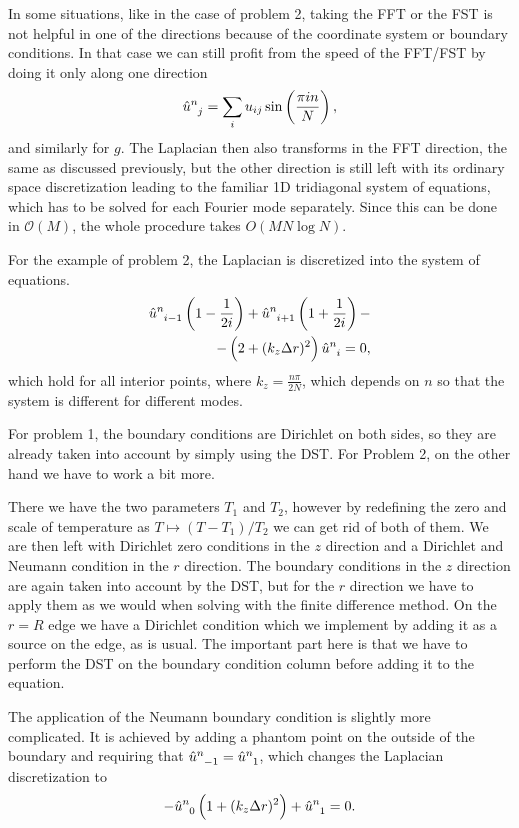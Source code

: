\documentclass[10pt,a4paper,twocolumn]{article}
\begin{document}
In some situations, like in the case of problem 2, taking the FFT or the FST is not helpful in one of the directions because of the coordinate system or boundary conditions. In that case we can still profit from the speed of the FFT/FST by doing it only along one direction
%
\begin{align}
    \tensor{\hat{u}}{^n_j} = \sum_{i} u_{ij} \sin \left( \frac{\pi i n}{N} \right),
\end{align}
%
and similarly for $g$. The Laplacian then also transforms in the FFT direction, the same as discussed previously, but the other direction is still left with its ordinary space discretization leading to the familiar 1D tridiagonal system of equations, which has to be solved for each Fourier mode separately. Since this can be done in $\mathcal{O}(M)$, the whole procedure takes $O(M N \log N)$.


For the example of problem 2, the Laplacian is discretized into the system of equations.
%
\begin{align}
    \tensor{\hat{u}}{^n_{i-1}} \left(1-\frac{1}{2 i}\right) + \tensor{\hat{u}}{^n_{i+1}} \left(1+\frac{1}{2 i}\right) -\notag\\- \left( 2 +  (k_z \Delta r)^2 \right) \tensor{\hat{u}}{^n_{i}} = 0,
\end{align}
%
which hold for all interior points, where $k_z = \frac{n \pi}{2 N}$, which depends on $n$ so that the system is different for different modes.

For problem 1, the boundary conditions are Dirichlet on both sides, so they are already taken into account by simply using the DST. For Problem 2, on the other hand we have to work a bit more.

There we have the two parameters $T_1$ and $T_2$, however by redefining the zero and scale of temperature as $T \mapsto (T - T_1) / T_2$ we can get rid of both of them. We are then left with Dirichlet zero conditions in the $z$ direction and a Dirichlet and Neumann condition in the $r$ direction. The boundary conditions in the $z$ direction are again taken into account by the DST, but for the $r$ direction we have to apply them as we would when solving with the finite difference method. On the $r=R$ edge we have a Dirichlet condition which we implement by adding it as a source on the edge, as is usual. The important part here is that we have to perform the DST on the boundary condition column before adding it to the equation.

The application of the Neumann boundary condition is slightly more complicated. It is achieved by adding a phantom point on the outside of the boundary and requiring that $\tensor{\hat{u}}{^n_{-1}} = \tensor{\hat{u}}{^n_{1}}$, which changes the Laplacian discretization to
%
\begin{align}
    -\tensor{\hat{u}}{^n_0} \left(1 + (k_z \Delta r)^2\right) + \tensor{\hat{u}}{^n_1} = 0.
\end{align}
\end{document}
